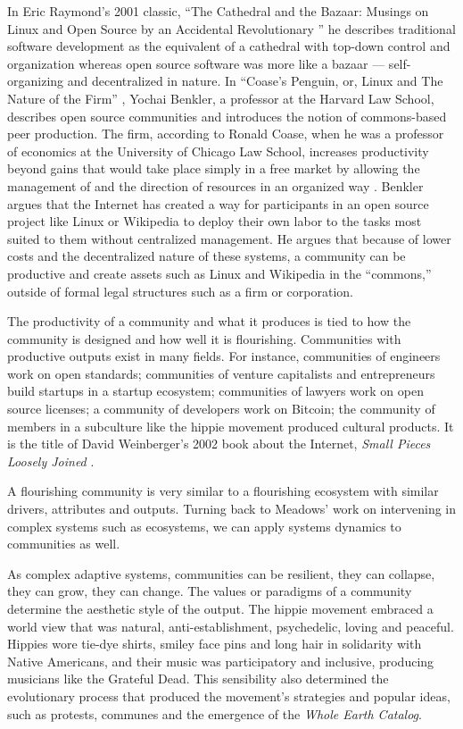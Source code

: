 In Eric Raymond's 2001 classic, ``The Cathedral and the Bazaar: Musings on Linux and Open Source by an Accidental Revolutionary '' \cite{raymond_cathedral_2001} he describes traditional software development as the equivalent of a cathedral with top-down control and organization whereas open source software was more like a bazaar --- self-organizing and decentralized in nature. In ``Coase's Penguin, or, Linux and The Nature of the Firm'' \cite{benkler_coases_2002}, Yochai Benkler, a professor at the Harvard Law School, describes open source communities and introduces the notion of commons-based peer production. The firm, according to Ronald Coase, when he was a professor of economics at the University of Chicago Law School, increases productivity beyond gains that would take place simply in a free market by allowing the management of and the direction of resources in an organized way \cite{coase_nature_1937}. Benkler argues that the Internet has created  a way for participants in an open source project like Linux or Wikipedia to deploy their own labor to the tasks most suited to them without centralized management. He argues that because of lower costs and the decentralized nature of these systems, a community can be productive and create assets such as Linux and Wikipedia in the ``commons,''  outside of formal legal structures such as a firm or corporation.

The productivity of a community and what it produces is tied to how the community is designed and how well it is flourishing. Communities with productive outputs exist in many fields. For instance, communities of engineers work on open standards; communities of venture capitalists and entrepreneurs build startups in a startup ecosystem; communities of lawyers work on open source licenses; a community of developers work on Bitcoin; the community of members in a subculture like the hippie movement produced cultural products. It is the title of David Weinberger's 2002 book about the Internet, \textit{Small Pieces Loosely Joined} \cite{weinberger2008small}.

A flourishing community is very similar to a flourishing ecosystem with similar drivers, attributes and outputs. Turning back to Meadows' work on intervening in complex systems such as ecosystems, we can apply systems dynamics to communities as well.

As complex adaptive systems, communities can be resilient, they can collapse, they can grow, they can change. The values or paradigms of a community determine the aesthetic style of the output. The hippie movement embraced a world view that was natural, anti-establishment, psychedelic, loving and peaceful. Hippies wore tie-dye shirts, smiley face pins and long hair in solidarity with Native Americans, and their music was participatory and inclusive, producing musicians like the Grateful Dead. This sensibility also determined the evolutionary process that produced the movement's strategies and popular ideas, such as protests, communes and the emergence of the \emph{Whole Earth Catalog}.

